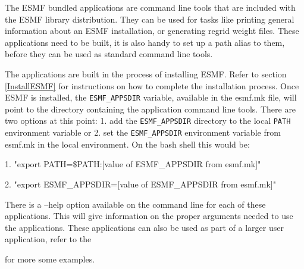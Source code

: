 
The ESMF bundled applications are command line tools that are included
with the ESMF library distribution.  They can be used for tasks like
printing general information about an ESMF installation, or generating
regrid weight files.  These applications need to be built, it is also
handy to set up a path alias to them, before they 
can be used as standard command line tools.

The applications are built in the process of installing ESMF.  Refer 
to section \ref{InstallESMF} for instructions on how to complete the 
installation process.  Once ESMF is installed, the {\tt ESMF\_APPSDIR} 
variable, available in the esmf.mk file,
will point to the directory containing the application command line 
tools.  There are two options at this point: 1. add the {\tt ESMF\_APPSDIR}
directory to the local {\tt PATH} environment variable or 2. set the 
{\tt ESMF\_APPSDIR} environment variable from esmf.mk in the local 
environment.  On the bash shell this would be:

1. "export PATH=\$PATH:[value of ESMF\_APPSDIR from esmf.mk]"

2. "export ESMF\_APPSDIR=[value of ESMF\_APPSDIR from esmf.mk]"

There is a --help option available on the command line for each 
of these applications.  This will give information on the proper
arguments needed to use the applications.  These applications can
also be used as part of a larger user application, refer to the 


for more some examples.  
